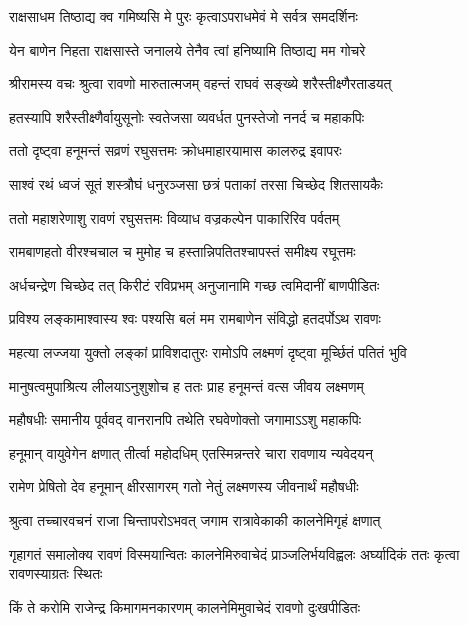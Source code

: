 \twolineshloka
{राक्षसाधम तिष्ठाद्य क्व गमिष्यसि मे पुरः}
{कृत्वाऽपराधमेवं मे सर्वत्र समदर्शिनः} %

\twolineshloka
{येन बाणेन निहता राक्षसास्ते जनालये}
{तेनैव त्वां हनिष्यामि तिष्ठाद्य मम गोचरे} %

\twolineshloka
{श्रीरामस्य वचः श्रुत्वा रावणो मारुतात्मजम्}
{वहन्तं राघवं सङ्ख्ये शरैस्तीक्ष्णैरताडयत्} %

\twolineshloka
{हतस्यापि शरैस्तीक्ष्णैर्वायुसूनोः स्वतेजसा}
{व्यवर्धत पुनस्तेजो ननर्द च महाकपिः} %

\twolineshloka
{ततो दृष्ट्वा हनूमन्तं सव्रणं रघुसत्तमः}
{क्रोधमाहारयामास कालरुद्र इवापरः} %

\twolineshloka
{साश्वं रथं ध्वजं सूतं शस्त्रौघं धनुरञ्जसा}
{छत्रं पताकां तरसा चिच्छेद शितसायकैः} %

\twolineshloka
{ततो महाशरेणाशु रावणं रघुसत्तमः}
{विव्याध वज्रकल्पेन पाकारिरिव पर्वतम्} %

\twolineshloka
{रामबाणहतो वीरश्चचाल च मुमोह च}
{हस्तान्निपतितश्चापस्तं समीक्ष्य रघूत्तमः} %

\twolineshloka
{अर्धचन्द्रेण चिच्छेद तत् किरीटं रविप्रभम्}
{अनुजानामि गच्छ त्वमिदानीं बाणपीडितः} %

\twolineshloka
{प्रविश्य लङ्कामाश्वास्य श्वः पश्यसि बलं मम}
{रामबाणेन संविद्धो हतदर्पोऽथ रावणः} %

\twolineshloka
{महत्या लज्जया युक्तो लङ्कां प्राविशदातुरः}
{रामोऽपि लक्ष्मणं दृष्ट्वा मूर्च्छितं पतितं भुवि} %

\twolineshloka
{मानुषत्वमुपाश्रित्य लीलयाऽनुशुशोच ह}
{ततः प्राह हनूमन्तं वत्स जीवय लक्ष्मणम्} %

\twolineshloka
{महौषधीः समानीय पूर्ववद् वानरानपि}
{तथेति रघवेणोक्तो जगामाऽऽशु महाकपिः} %

\twolineshloka
{हनूमान् वायुवेगेन क्षणात् तीर्त्वा महोदधिम्}
{एतस्मिन्नन्तरे चारा रावणाय न्यवेदयन्} %

\twolineshloka
{रामेण प्रेषितो देव हनूमान् क्षीरसागरम्}
{गतो नेतुं लक्ष्मणस्य जीवनार्थं महौषधीः} %

\twolineshloka
{श्रुत्वा तच्चारवचनं राजा चिन्तापरोऽभवत्}
{जगाम रात्रावेकाकी कालनेमिगृहं क्षणात्} %

\threelineshloka
{गृहागतं समालोक्य रावणं विस्मयान्वितः}
{कालनेमिरुवाचेदं प्राञ्जलिर्भयविह्वलः}
{अर्घ्यादिकं ततः कृत्वा रावणस्याग्रतः स्थितः} %

\twolineshloka
{किं ते करोमि राजेन्द्र किमागमनकारणम्}
{कालनेमिमुवाचेदं रावणो दुःखपीडितः} %

